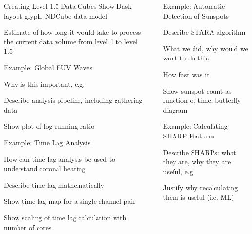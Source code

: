 \documentclass[final]{beamer}
\newlength{\sepwidth}
\newlength{\colwidth}
\newcommand{\separatorcolumn}{\begin{column}{\sepwidth}\end{column}}
\begin{document}
\begin{frame}[t]
\begin{columns}[t]
\begin{column}{\colwidth}
\begin{block}{Creating Level 1.5 Data Cubes}
    Show Dask layout glyph, NDCube data model

    Estimate of how long it would take to process the current data volume from level 1 to level 1.5

  \end{block}

  \begin{block}{Example: Global EUV Waves}

    Why is this important, e.g. \citet{liu_truly_2018}

    Describe analysis pipeline, including gathering data

    Show plot of log running ratio

  \end{block}

  \begin{block}{Example: Time Lag Analysis}

    How can time lag analysis be used to understand coronal heating \citet{viall_evidence_2012}

    Describe time lag mathematically \citet{barnes_understanding_2019}

    Show time lag map for a single channel pair

    Show scaling of time lag calculation with number of cores

  \end{block}

\end{column}

\separatorcolumn

\begin{column}{\colwidth}

  \begin{block}{Example: Automatic Detection of Sunspots}

    Describe STARA algorithm \citet{watson_modelling_2009}

    What we did, why would we want to do this

    How fast was it

    Show sunspot count as function of time, butterfly diagram

  \end{block}

  \begin{block}{Example: Calculating SHARP Features}

    Describe SHARPs: what they are, why they are useful, e.g. \citet{bobra_helioseismic_2014}

    Justify why recalculating them is useful (i.e. ML)


\end{block}
\end{column}
\end{columns}
\end{frame}
\end{document}
